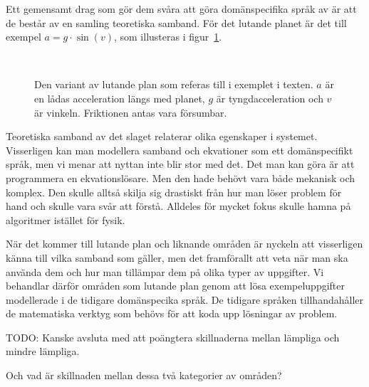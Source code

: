 \begin{binge}
Ett gemensamt drag som gör dem svåra att göra domänspecifika språk av är att de
består av en samling teoretiska samband. För det lutande planet är det till
exempel $a = g \cdot \sin(v)$, som illusteras i figur~\ref{fig:lutande_plan}.

\begin{figure}[tph]
  \caption{Den variant av lutande plan som referas till i exemplet i texten. $a$
  är en lådas acceleration längs med planet, $g$ är tyngdacceleration och $v$ är
  vinkeln. Friktionen antas vara försumbar.}~\label{fig:lutande_plan}
\end{figure}

Teoretiska samband av det slaget relaterar olika egenskaper i systemet.
Visserligen kan man modellera samband och ekvationer som ett domänspecifikt
språk, men vi menar att nyttan inte blir stor med det. Det man kan göra är att
programmera en ekvationslösare. Men den hade behövt vara både mekanisk och
komplex. Den skulle alltså skilja sig drastiskt från hur man löser problem för
hand och skulle vara svår att förstå. Alldeles för mycket fokus skulle hamna på
algoritmer istället för fysik.

När det kommer till lutande plan och liknande områden är nyckeln att visserligen
känna till vilka samband som gäller, men det framförallt att veta när man ska
använda dem och hur man tillämpar dem på olika typer av uppgifter. Vi behandlar
därför områden som lutande plan genom att lösa exempeluppgifter modellerade i de
tidigare domänspecika språk. De tidigare språken tillhandahåller de matematiska
verktyg som behövs för att koda upp lösningar av problem.


TODO: Kanske avsluta med att poängtera skillnaderna mellan lämpliga och mindre lämpliga.

Och vad är skillnaden mellan dessa två kategorier av områden?


\end{binge}
